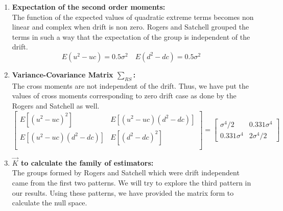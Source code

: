 \documentclass[12pt]{article}   	%
\begin{document}
\begin{enumerate}
\item \textbf{Expectation of the second order moments:}\\
The function of the expected values of quadratic extreme terms becomes non linear and complex when drift is non zero. Rogers and Satchell grouped the terms in such a way that the expectation of the group is independent of the drift.
$$ E(u^2-uc )=0.5\sigma^2\quad  E(d^2-dc)=0.5\sigma^2\quad$$

\item \textbf{Variance-Covariance Matrix $\sum_{RS} $:}\\
The cross moments are not independent of the drift. Thus, we have put the values of cross moments corresponding to zero drift case as done by the Rogers and Satchell as well.
 $$  \begin{bmatrix}
			E[(u^2-uc)^2]&E[(u^2-uc)(d^2-dc)]\\
			E[(u^2-uc)(d^2-dc)]&E[(d^2-dc)^2]\\
			\end{bmatrix}
=\begin{bmatrix}
\sigma^4/2&0.331\sigma^4\\
0.331\sigma^4 & 2\sigma^4/2
\end{bmatrix}$$
\item \textbf{$\vec{K}$ to calculate the family of estimators:}\\
The groups formed by Rogers and Satchell which were drift independent came from the first two patterns. We will try to explore the third pattern in our results. Using these patterns, we have provided the matrix form to calculate the null space.


\end{enumerate}
\end{document}
